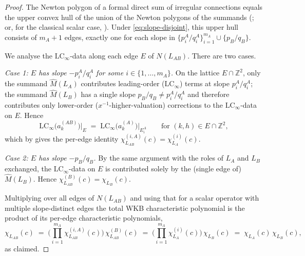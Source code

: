 \documentclass[11pt,a4paper]{article}
\theoremstyle{plain}
\theoremstyle{definition}
\theoremstyle{remark}
\newcommand{\LCinf}{\mathrm{LC}_\infty}
\begin{document}
\begin{proof}
The Newton polygon of a formal direct sum of irregular connections
equals the upper convex hull of the union of the Newton polygons of the
summands (\cite[Ch.~III, \S 1]{sabbah-isomon}; or, for the classical
scalar case, \cite[Ch.~II]{robba-malgrange}). Under
\eqref{eq:slope-disjoint}, this upper hull consists of $m_A + 1$ edges,
exactly one for each slope in $\{p_i^A/q_i^A\}_{i=1}^{m_A} \cup
\{p_B/q_B\}$.

We analyse the $\LCinf$-data along each edge $E$ of $N(L_{AB})$. There
are two cases.

\smallskip
\textit{Case 1: $E$ has slope $-p_i^A/q_i^A$ for some
$i \in \{1, \dots, m_A\}$.}
On the lattice $E \cap \mathbb{Z}^2$, only the summand $\widehat M(L_A)$
contributes leading-order ($\LCinf$) terms at slope $p_i^A/q_i^A$;
the summand $\widehat M(L_B)$ has a single slope $p_B/q_B \ne p_i^A/q_i^A$
and therefore contributes only lower-order ($x^{-1}$-higher-valuation)
corrections to the $\LCinf$-data on $E$. Hence
\[
   \LCinf\!\big(a_k^{(AB)}\big)\big|_{E}
   \;=\;
   \LCinf\!\big(a_k^{(A)}\big)\big|_{E_i^A}
   \qquad \text{for } (k, h) \in E \cap \mathbb{Z}^2,
\]
which by  gives the per-edge identity
$\chi^{(i,A)}_{L_{AB}}(c) = \chi^{(i)}_{L_A}(c)$.

\smallskip
\textit{Case 2: $E$ has slope $-p_B/q_B$.}
By the same argument with the roles of $L_A$ and $L_B$ exchanged, the
$\LCinf$-data on $E$ is contributed solely by the (single edge of)
$\widehat M(L_B)$. Hence
$\chi^{(B)}_{L_{AB}}(c) = \chi_{L_B}(c)$.

\smallskip
Multiplying over all edges of $N(L_{AB})$ and using that for a scalar
operator with multiple slope-distinct edges the total WKB characteristic
polynomial is the product of its per-edge characteristic polynomials,
\[
   \chi_{L_{AB}}(c)
   \;=\;
   \Big(\prod_{i=1}^{m_A} \chi^{(i,A)}_{L_{AB}}(c)\Big)\,
   \chi^{(B)}_{L_{AB}}(c)
   \;=\;
   \Big(\prod_{i=1}^{m_A} \chi^{(i)}_{L_A}(c)\Big)\,
   \chi_{L_B}(c)
   \;=\;
   \chi_{L_A}(c)\, \chi_{L_B}(c),
\]
as claimed.
\end{proof}
\end{document}
